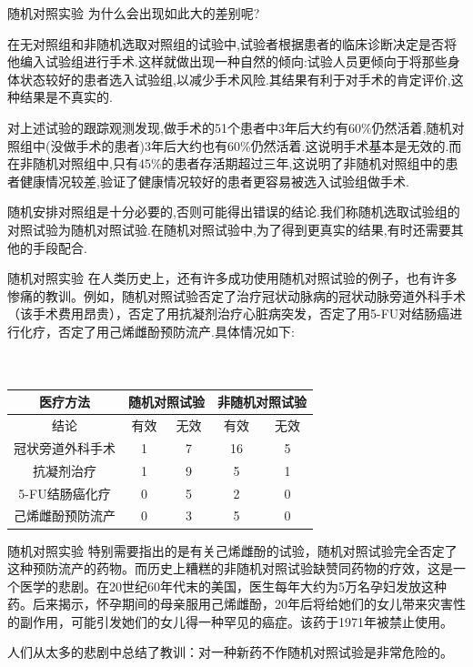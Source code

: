	\begin{frame}{随机对照实验}
		为什么会出现如此大的差别呢?
		
		在无对照组和非随机选取对照组的试验中,试验者根据患者的临床诊断决定是否将他编入试验组进行手术.这样就做出现一种自然的倾向:试验人员更倾向于将那些身体状态较好的患者选入试验组,以减少手术风险.其结果有利于对手术的肯定评价,这种结果是不真实的.
		
		对上述试验的跟踪观测发现,做手术的51个患者中3年后大约有60\%仍然活着,随机对照组中(没做手术的患者)3年后大约也有60\%仍然活着.这说明手术基本是无效的.而在非随机对照组中,只有45\%的患者存活期超过三年,这说明了非随机对照组中的患者健康情况较差,验证了健康情况较好的患者更容易被选入试验组做手术.
		
		随机安排对照组是十分必要的,否则可能得出错误的结论.我们称随机选取试验组的对照试验为\alert{随机对照试验}.在随机对照试验中,为了得到更真实的结果,有时还需要其他的手段配合.
	\end{frame}		
	\begin{frame}{随机对照实验}
		在人类历史上，还有许多成功使用随机对照试验的例子，也有许多惨痛的教训。例如，随机对照试验否定了治疗冠状动脉病的冠状动脉旁道外科手术（该手术费用昂贵），否定了用抗凝剂治疗心脏病突发，否定了用5-FU对结肠癌进行化疗，否定了用己烯雌酚预防流产.具体情况如下:
		\\ \hspace*{\fill} \\%
		$\quad\quad\quad$\begin{tabular}{|c|c|c|c|c|}
			\hline 医疗方法 & \multicolumn{2}{|c|}{随机对照试验} & \multicolumn{2}{|c|}{非随机对照试验}\\
			\hline 结论 & 有效 & 无效 & 有效 & 无效 \\
			\hline 冠状旁道外科手术 & 1 & 7 & 16 & 5 \\
			\hline 抗凝剂治疗 & 1 & 9 & 5 & 1 \\
			\hline 5-FU结肠癌化疗 & 0 & 5 & 2 & 0 \\
			\hline 己烯雌酚预防流产 & 0 & 3 & 5 & 0 \\
			\hline
		\end{tabular}
		
	\end{frame}	
		
	\begin{frame}{随机对照实验}	
		特别需要指出的是有关己烯雌酚的试验，随机对照试验完全否定了这种预防流产的药物。而历史上糟糕的非随机对照试验缺赞同药物的疗效，这是一个医学的悲剧。在20世纪60年代末的美国，医生每年大约为5万名孕妇发放这种药。后来揭示，怀孕期间的母亲服用己烯雌酚，20年后将给她们的女儿带来灾害性的副作用，可能引发她们的女儿得一种罕见的癌症。该药于1971年被禁止使用。
		
		人们从太多的悲剧中总结了教训：对一种新药不作随机对照试验是非常危险的。
			
	\end{frame}	
	

